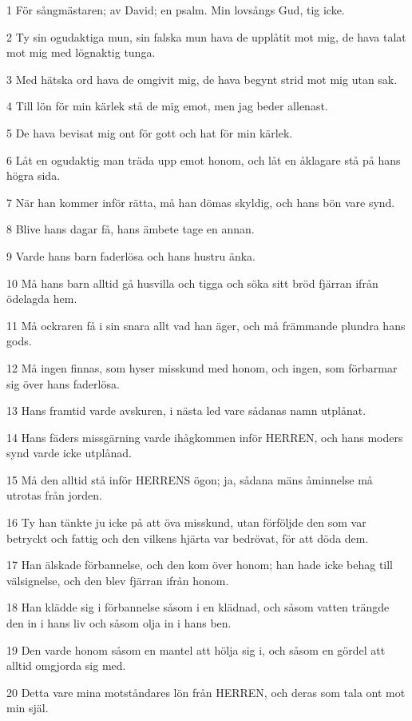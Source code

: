 \par 1 För sångmästaren; av David; en psalm. Min lovsångs Gud, tig icke.
\par 2 Ty sin ogudaktiga mun, sin falska mun hava de upplåtit mot mig, de hava talat mot mig med lögnaktig tunga.
\par 3 Med hätska ord hava de omgivit mig, de hava begynt strid mot mig utan sak.
\par 4 Till lön för min kärlek stå de mig emot, men jag beder allenast.
\par 5 De hava bevisat mig ont för gott och hat för min kärlek.
\par 6 Låt en ogudaktig man träda upp emot honom, och låt en åklagare stå på hans högra sida.
\par 7 När han kommer inför rätta, må han dömas skyldig, och hans bön vare synd.
\par 8 Blive hans dagar få, hans ämbete tage en annan.
\par 9 Varde hans barn faderlösa och hans hustru änka.
\par 10 Må hans barn alltid gå husvilla och tigga och söka sitt bröd fjärran ifrån ödelagda hem.
\par 11 Må ockraren få i sin snara allt vad han äger, och må främmande plundra hans gods.
\par 12 Må ingen finnas, som hyser misskund med honom, och ingen, som förbarmar sig över hans faderlösa.
\par 13 Hans framtid varde avskuren, i nästa led vare sådanas namn utplånat.
\par 14 Hans fäders missgärning varde ihågkommen inför HERREN, och hans moders synd varde icke utplånad.
\par 15 Må den alltid stå inför HERRENS ögon; ja, sådana mäns åminnelse må utrotas från jorden.
\par 16 Ty han tänkte ju icke på att öva misskund, utan förföljde den som var betryckt och fattig och den vilkens hjärta var bedrövat, för att döda dem.
\par 17 Han älskade förbannelse, och den kom över honom; han hade icke behag till välsignelse, och den blev fjärran ifrån honom.
\par 18 Han klädde sig i förbannelse såsom i en klädnad, och såsom vatten trängde den in i hans liv och såsom olja in i hans ben.
\par 19 Den varde honom såsom en mantel att hölja sig i, och såsom en gördel att alltid omgjorda sig med.
\par 20 Detta vare mina motståndares lön från HERREN, och deras som tala ont mot min själ.
